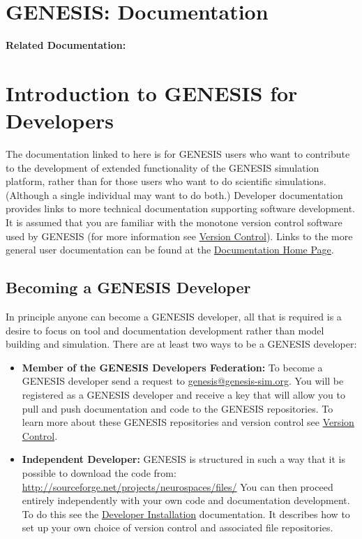 \documentclass[12pt]{article}
\begin{document}
\section*{GENESIS: Documentation}

{\bf Related Documentation:}

\section*{Introduction to GENESIS for Developers}

The documentation linked to here is for GENESIS users who want to contribute to the development of extended functionality of the GENESIS simulation platform, rather than for those users who want to do scientific simulations. (Although a single individual may want to do both.) Developer documentation provides links to more technical documentation supporting software development. It is assumed that you are familiar with the monotone version control software used by GENESIS (for more information see \href{../version-control/version-control.tex}{Version Control}). Links to the more general user documentation can be found at the \href{../documentation-homepage/documentation-homepage.tex}{Documentation Home Page}. 

\subsection*{Becoming a GENESIS Developer}

In principle anyone can become a GENESIS developer, all that is required is a desire to focus on tool and documentation development rather than model building and simulation. There are at least two ways to be a GENESIS  developer:

\begin{itemize}
	\item {\bf Member of the GENESIS Developers Federation:} To become a GENESIS developer send a request to 
	\href{mailto:genesis@genesis-sim.org}{genesis@genesis-sim.org}. You will be registered as a GENESIS developer 
	and receive a key that will allow you to pull and push documentation and code to the GENESIS repositories. To learn more 
	about these GENESIS repositories and version control see \href{../version-control/version-control.tex}{Version Control}.
	
	\item {\bf Independent Developer:} GENESIS is structured in such a way that it is possible to download the code from:
	\href{http://sourceforge.net/projects/neurospaces/files/}{http://sourceforge.net/projects/neurospaces/files/}
	You can then proceed entirely independently with your own code and documentation development. To do this see the 
	\href{../installation-developer/installation-developer.tex}{Developer Installation} documentation. It describes how to set up 
	your own choice of version control and associated file repositories.

\end{itemize}
\end{document}
